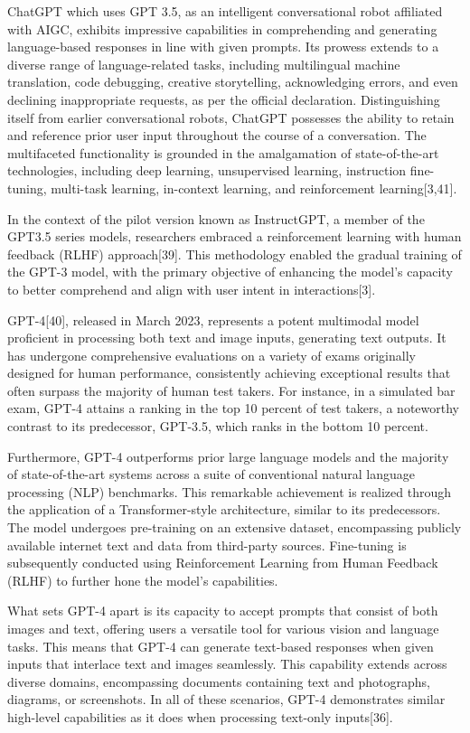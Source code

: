 \documentclass[conference]{IEEEtran}
\begin{document}
ChatGPT which uses GPT 3.5, as an intelligent conversational robot affiliated with AIGC, exhibits impressive capabilities in comprehending and generating language-based responses in line with given prompts. Its prowess extends to a diverse range of language-related tasks, including multilingual machine translation, code debugging, creative storytelling, acknowledging errors, and even declining inappropriate requests, as per the official declaration. Distinguishing itself from earlier conversational robots, ChatGPT possesses the ability to retain and reference prior user input throughout the course of a conversation. The multifaceted functionality is grounded in the amalgamation of state-of-the-art technologies, including deep learning, unsupervised learning, instruction fine-tuning, multi-task learning, in-context learning, and reinforcement learning[3,41].

In the context of the pilot version known as InstructGPT, a member of the GPT3.5 series models, researchers embraced a reinforcement learning with human feedback (RLHF) approach[39]. This methodology enabled the gradual training of the GPT-3 model, with the primary objective of enhancing the model's capacity to better comprehend and align with user intent in interactions[3].

GPT-4[40], released in March 2023, represents a potent multimodal model proficient in processing both text and image inputs, generating text outputs. It has undergone comprehensive evaluations on a variety of exams originally designed for human performance, consistently achieving exceptional results that often surpass the majority of human test takers. For instance, in a simulated bar exam, GPT-4 attains a ranking in the top 10 percent of test takers, a noteworthy contrast to its predecessor, GPT-3.5, which ranks in the bottom 10 percent.

Furthermore, GPT-4 outperforms prior large language models and the majority of state-of-the-art systems across a suite of conventional natural language processing (NLP) benchmarks. This remarkable achievement is realized through the application of a Transformer-style architecture, similar to its predecessors. The model undergoes pre-training on an extensive dataset, encompassing publicly available internet text and data from third-party sources. Fine-tuning is subsequently conducted using Reinforcement Learning from Human Feedback (RLHF) to further hone the model's capabilities.

What sets GPT-4 apart is its capacity to accept prompts that consist of both images and text, offering users a versatile tool for various vision and language tasks. This means that GPT-4 can generate text-based responses when given inputs that interlace text and images seamlessly. This capability extends across diverse domains, encompassing documents containing text and photographs, diagrams, or screenshots. In all of these scenarios, GPT-4 demonstrates similar high-level capabilities as it does when processing text-only inputs[36].
\end{document}
